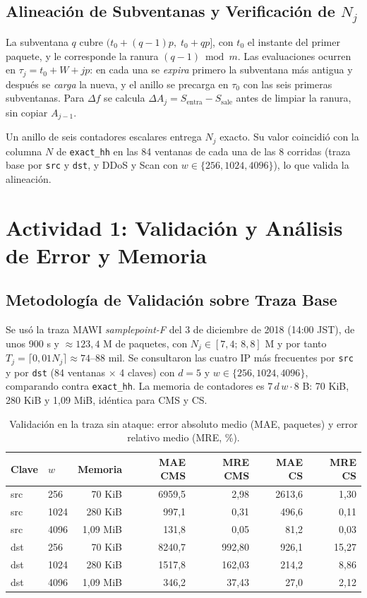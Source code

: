 \documentclass[10pt,a4paper]{article}
\begin{document}
\subsection{Alineación de Subventanas y Verificación de $N_j$}

La subventana $q$ cubre $(t_0+(q-1)p,\;t_0+qp]$, con $t_0$ el instante del primer paquete, y le corresponde la ranura $(q-1)\bmod m$. Las evaluaciones ocurren en $\tau_j=t_0+W+jp$: en cada una se \emph{expira} primero la subventana más antigua y después se \emph{carga} la nueva, y el anillo se precarga en $\tau_0$ con las seis primeras subventanas. Para $\Delta f$ se calcula $\Delta A_j=S_{\text{entra}}-S_{\text{sale}}$ antes de limpiar la ranura, sin copiar $A_{j-1}$.

Un anillo de seis contadores escalares entrega $N_j$ exacto. Su valor coincidió con la columna $N$ de \texttt{exact\_hh} en las 84 ventanas de cada una de las 8 corridas (traza base por \texttt{src} y \texttt{dst}, y DDoS y Scan con $w\in\{256,1024,4096\}$), lo que valida la alineación.

\section{Actividad 1: Validación y Análisis de Error y Memoria}
\subsection{Metodología de Validación sobre Traza Base}

Se usó la traza MAWI \emph{samplepoint-F} del 3 de diciembre de 2018 (14:00 JST), de unos 900 s y $\approx 123{,}4$ M de paquetes, con $N_j\in[7{,}4;\,8{,}8]$ M y por tanto $T_j=\lceil 0{,}01N_j\rceil\approx 74$--$88$ mil. Se consultaron las cuatro IP más frecuentes por \texttt{src} y por \texttt{dst} (84 ventanas $\times$ 4 claves) con $d=5$ y $w\in\{256,1024,4096\}$, comparando contra \texttt{exact\_hh}. La memoria de contadores es $7\,d\,w\cdot 8$ B: 70 KiB, 280 KiB y 1,09 MiB, idéntica para CMS y CS.

\begin{table}[!htbp]
\centering\small
\caption{Validación en la traza sin ataque: error absoluto medio (MAE, paquetes) y error relativo medio (MRE, \%).}
\label{tab:validacion}
\begin{tabular}{llrrrrr}
\toprule
Clave & $w$ & Memoria & MAE CMS & MRE CMS & MAE CS & MRE CS \\
\midrule
src & 256  & 70 KiB   & 6959,5 & 2,98   & 2613,6 & 1,30 \\
src & 1024 & 280 KiB  & 997,1  & 0,31   & 496,6  & 0,11 \\
src & 4096 & 1,09 MiB & 131,8  & 0,05   & 81,2   & 0,03 \\
dst & 256  & 70 KiB   & 8240,7 & 992,80 & 926,1  & 15,27 \\
dst & 1024 & 280 KiB  & 1517,8 & 162,03 & 214,2  & 8,86 \\
dst & 4096 & 1,09 MiB & 346,2  & 37,43  & 27,0   & 2,12 \\
\bottomrule
\end{tabular}
\end{table}
\end{document}
